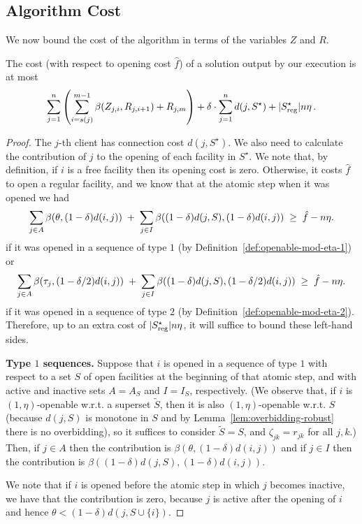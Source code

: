 \subsection{Algorithm Cost}

We now bound the cost of the algorithm in terms of the variables $Z$ and $R$.

\begin{lemma}
\label{lemma:alg-cost-robust}
    The cost (with respect to opening cost $\hat{f}$) of a solution output by our execution is at most
    \[\sum_{j=1}^n \left(\sum_{i=s(j)}^{m-1} \beta(Z_{j,i}, R_{j,i+1}) + R_{j, m}\right) + \delta \cdot \sum_{j=1}^n d(j,S^\star) + |S_{\mathrm{reg}}^\star| n \eta\,.\]
\end{lemma}
\begin{proof}
    The $j$-th client has connection cost $d(j, S^\star)$.
    We also need to calculate the contribution of $j$ to the opening of each facility in $S^\star$.    
    We note that, by definition, if $i$ is a free facility then its opening cost is zero.
    Otherwise, it costs $\hat{f}$ to open a regular facility, and we know that at the atomic step when it was opened we had
\[
\sum_{j\in A}\beta(\theta, (1-\delta)d(i,j))
\;+\;
\sum_{j\in I}\beta((1-\delta)d(j,S), (1-\delta)d(i,j))
\;\ge\; \hat f - n \eta.
\]
    if it was opened in a sequence of type $1$ (by Definition~\ref{def:openable-mod-eta-1})
    or 
\[
\sum_{j\in A}\beta(\tau_j, (1-\delta/2)d(i,j))
\;+\;
\sum_{j\in I}\beta((1-\delta)d(j,S), (1-\delta/2)d(i,j))
\;\ge\; \hat f - n \eta.
\]
  if it was opened in a sequence of type $2$ (by Definition~\ref{def:openable-mod-eta-2}).
  Therefore, up to an extra cost of $|S_{\mathrm{reg}}^\star| n \eta$, it will suffice to bound these left-hand sides.

    \textbf{Type $1$ sequences.}
    Suppose that $i$ is opened in a sequence of type $1$ with respect to a set $S$ of open facilities at the beginning of that atomic step, and with active and inactive sets $A = A_S$ and $I=I_S$, respectively.
    (We observe that, if $i$ is $(1,\eta)$-openable w.r.t. a superset $\tilde{S}$, then it is also $(1,\eta)$-openable w.r.t. $S$ (because $d(j, S)$ is monotone in $S$ and by Lemma~\ref{lem:overbidding-robust} there is no overbidding), so it suffices to consider $\tilde{S} = S$, and $\zeta_{jk} = r_{jk}$ for all $j,k$.)
    Then, if $j \in A$ then the contribution is $\beta(\theta, (1-\delta)d(i,j))$ and if $j \in I$ then the contribution is $\beta((1-\delta)d(j,S), (1-\delta)d(i, j))$.
    
    We note that if $i$ is opened before the atomic step in which $j$ becomes inactive, we have that the contribution is zero, because $j$ is active after the opening of $i$ and hence $\theta < (1-\delta)d(j,S \cup \{i\})$.


\end{proof}
